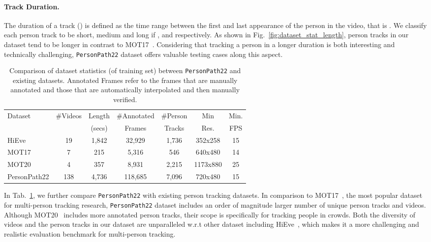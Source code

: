 \documentclass[runningheads]{llncs}
\begin{document}
\paragraph{\textbf{Track Duration.}} The duration of a track () is defined as the time range between the first and last appearance of the person in the video, that is  . We classify each person track to be short, medium and long if ,  and  respectively. As shown in Fig.~\ref{fig:dataset_stat_length}, person tracks in our dataset tend to be longer in contrast to MOT17~\cite{mot}. Considering that tracking a person in a longer duration is both interesting and technically challenging, \texttt{PersonPath22} dataset offers valuable testing cases along this aspect.




\begin{table}[t]
    \centering
    \begin{tabular}{lcccccc}
    \toprule
         \multirow{2}{*}{Dataset} & \#Videos & Length & \#Annotated & \#Person & Min & Min.  \\
         &  & (secs) & Frames  & Tracks & Res. & FPS \\
         \midrule
HiEve\cite{hieve} & 19 & 1,842 & 32,929  & 1,736 & 352x258  & 15 \\
         MOT17\cite{mot} & 7 & 215  & 5,316   & 546 & 640x480 & 14 \\
         MOT20\cite{mot20} & 4 & 357  & 8,931   & 2,215 & 1173x880 & 25\\
         PersonPath22 & 138 & 4,736 &  118,685 & 7,096 & 720x480& 15 \\
    \bottomrule
    \end{tabular}
    \caption{ \small Comparison of dataset statistics (of training set) between \texttt{PersonPath22} and existing datasets. Annotated Frames refer to the frames that are manually annotated and those that are automatically interpolated and then manually verified.
}
    
    \label{tab:comparison}
\end{table}

In Tab.~\ref{tab:comparison}, we further compare \texttt{PersonPath22} with existing person tracking datasets. In comparison to MOT17~\cite{mot}, the most popular dataset for multi-person tracking research, \texttt{PersonPath22} dataset includes an order of magnitude larger number of unique person tracks and videos. 
Although MOT20~\cite{mot20} includes more annotated person tracks, their scope is specifically for tracking people in crowds.
Both the diversity of videos and the person tracks in our dataset are unparalleled w.r.t other dataset including HiEve~\cite{hieve}, which makes it a more challenging and realistic evaluation benchmark for multi-person tracking.
\end{document}
